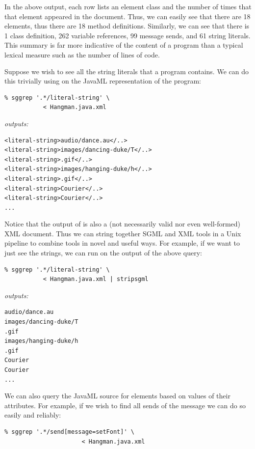 \documentclass{article}
\begin{document}
\begin{multicols}{2}
In the above output, each row lists an element class and the number of
times that that element appeared in the document.  Thus, we can easily
see that there are 18  elements, thus there are 18
method definitions.  Similarly, we can see that there is 1 class
definition, 262 variable references, 99 message sends, and 61 string
literals.  This summary is far more indicative of the content of a
program than a typical lexical measure such as the number of lines of
code.

Suppose we wish to see all the string literals that a program contains.
We can do this trivially using  on the JavaML
representation of the program:

\begin{verbatim}
% sggrep '.*/literal-string' \
           < Hangman.java.xml
\end{verbatim}

\noindent\emph{outputs:}
{\small
\begin{verbatim}
<literal-string>audio/dance.au</..>
<literal-string>images/dancing-duke/T</..>
<literal-string>.gif</..>
<literal-string>images/hanging-duke/h</..>
<literal-string>.gif</..>
<literal-string>Courier</..>
<literal-string>Courier</..>
...
\end{verbatim}
}

\noindent Notice that the output of  is also a (not necessarily
valid nor even well-formed) XML document.  Thus we can string together
SGML and XML tools in a Unix pipeline to combine tools in novel and
useful ways.  For example, if we want to just see the strings, we can
run  on the output of the above query:

\begin{verbatim}
% sggrep '.*/literal-string' \
           < Hangman.java.xml | stripsgml
\end{verbatim}

\noindent\emph{outputs:}
\begin{verbatim}
audio/dance.au
images/dancing-duke/T
.gif
images/hanging-duke/h
.gif
Courier
Courier
...
\end{verbatim}

We can also query the JavaML source for elements based on values of
their attributes.  For example, if we wish to find all sends of the
message  we can do so easily and reliably:

\begin{verbatim}
% sggrep '.*/send[message=setFont]' \
                      < Hangman.java.xml 
\end{verbatim}


\end{multicols}
\end{document}
